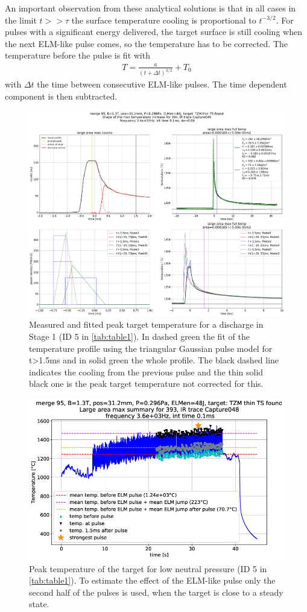 An important observation from these analytical solutions is that in all cases in the limit $t>>\tau$ the surface temperature cooling is proportional to $t^{-3/2}$. For pulses with a significant energy delivered, the target surface is still cooling when the next ELM-like pulse comes, so the temperature has to be corrected. The temperature before the pulse is fit with
\begin{equation}
\label{eq:squareSS}
\begin{aligned}
T=\frac{a}{ (t+ \Delta t)^{3/2}} + T_{0}
\end{aligned}
\end{equation}
with $\Delta t$ the time between consecutive ELM-like pulses. The time dependent component is then subtracted.


\begin{figure}
	\centering
	\includegraphics[width=0.7\linewidth,trim={750 550 10 115},clip]{Chapters/chapter3/figs/file_index_394_IR_trace_Capture049_43_old.png}
	\caption{Measured and fitted peak target temperature for a discharge in Stage 1 (ID 5 in \autoref{tab:table1}). In dashed green the fit of the temperature profile using the triangular Gaussian pulse model for t>1.5ms and in solid green the whole profile. The black dashed line indicates the cooling from the previous pulse and the thin solid black one is the peak target temperature not corrected for this.}
	\label{fig:IR4}
\end{figure}

\begin{figure}
	\centering
	\includegraphics[width=0.7\linewidth,trim={5 5 55 65},clip]{Chapters/chapter3/figs/file_index_393_IR_trace_Capture048_46.png}
	\caption{Peak temperature of the target for low neutral pressure (ID 5 in \autoref{tab:table1}). To estimate the effect of the ELM-like pulse only the second half of the pulses is used, when the target is close to a steady state.}
	\label{fig:IR5}
\end{figure}

